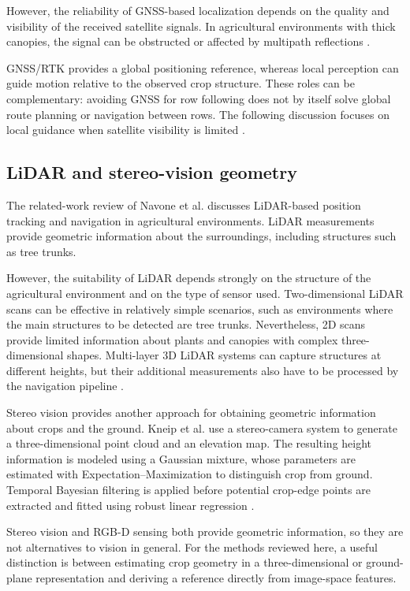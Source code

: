 However, the reliability of GNSS-based localization depends on the
quality and visibility of the received satellite signals. In agricultural
environments with thick canopies, the signal can be obstructed or
affected by multipath reflections \cite[Section~2]{navone2025gpsfree}.

GNSS/RTK provides a global positioning reference, whereas local
perception can guide motion relative to the observed crop structure.
These roles can be complementary: avoiding GNSS for row following does
not by itself solve global route planning or navigation between rows.
The following discussion focuses on local guidance when satellite
visibility is limited \cite[Sections~4.2--4.3]{bai2023vision}.

\subsection{LiDAR and stereo-vision geometry}
\label{subsec:lidar_mappe}

The related-work review of Navone et al. discusses LiDAR-based position
tracking and navigation in agricultural environments. LiDAR measurements
provide geometric information about the surroundings, including structures
such as tree trunks.

However, the suitability of LiDAR depends strongly on the structure of
the agricultural environment and on the type of sensor used.
Two-dimensional LiDAR scans can be effective in relatively simple scenarios,
such as environments where the main structures to be detected are tree
trunks. Nevertheless, 2D scans provide limited information about plants
and canopies with complex three-dimensional shapes. Multi-layer 3D LiDAR
systems can capture structures at different heights, but their additional
measurements also have to be processed by the navigation pipeline
\cite[Section~2]{navone2025gpsfree}.

Stereo vision provides another approach for obtaining geometric
information about crops and the ground. Kneip et al. use a stereo-camera
system to generate a three-dimensional point cloud and an elevation map.
The resulting height information is modeled using a Gaussian mixture,
whose parameters are estimated with Expectation--Maximization to
distinguish crop from ground. Temporal Bayesian filtering is applied
before potential crop-edge points are extracted and fitted using robust
linear regression \cite{kneip2020cropedge}.

Stereo vision and RGB-D sensing both provide geometric information, so
they are not alternatives to vision in general. For the methods reviewed
here, a useful distinction is between estimating crop geometry in a
three-dimensional or ground-plane representation and deriving a reference
directly from image-space features.

